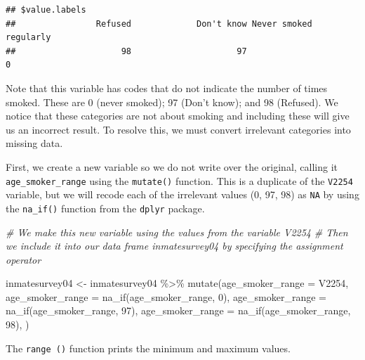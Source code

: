 \documentclass[
]{book}
\newenvironment{Shaded}{\begin{snugshade}}{\end{snugshade}}
\newcommand{\AttributeTok}[1]{\textcolor[rgb]{0.77,0.63,0.00}{#1}}
\newcommand{\CommentTok}[1]{\textcolor[rgb]{0.56,0.35,0.01}{\textit{#1}}}
\newcommand{\ConstantTok}[1]{\textcolor[rgb]{0.00,0.00,0.00}{#1}}
\newcommand{\DecValTok}[1]{\textcolor[rgb]{0.00,0.00,0.81}{#1}}
\newcommand{\FunctionTok}[1]{\textcolor[rgb]{0.00,0.00,0.00}{#1}}
\newcommand{\NormalTok}[1]{#1}
\newcommand{\OtherTok}[1]{\textcolor[rgb]{0.56,0.35,0.01}{#1}}
\newcommand{\SpecialCharTok}[1]{\textcolor[rgb]{0.00,0.00,0.00}{#1}}
\begin{document}
\begin{verbatim}
## $value.labels
##                Refused             Don't know Never smoked regularly 
##                     98                     97                      0
\end{verbatim}

Note that this variable has codes that do not indicate the number of times smoked. These are 0 (never smoked); 97 (Don't know); and 98 (Refused). We notice that these categories are not about smoking and including these will give us an incorrect result. To resolve this, we must convert irrelevant categories into missing data.

First, we create a new variable so we do not write over the original, calling it \texttt{age\_smoker\_range} using the \texttt{mutate()} function. This is a duplicate of the \texttt{V2254} variable, but we will recode each of the irrelevant values (0, 97, 98) as \texttt{NA} by using the \texttt{na\_if()} function from the \texttt{dplyr} package.

\begin{Shaded}
\begin{Highlighting}[]
\CommentTok{\# We make this new variable using the values from the variable \textquotesingle{}V2254\textquotesingle{}}
\CommentTok{\# Then we include it into our data frame \textquotesingle{}inmatesurvey04\textquotesingle{} by specifying the assignment operator}

\NormalTok{inmatesurvey04 }\OtherTok{\textless{}{-}}\NormalTok{ inmatesurvey04 }\SpecialCharTok{\%\textgreater{}\%} 
  \FunctionTok{mutate}\NormalTok{(}\AttributeTok{age\_smoker\_range =}\NormalTok{ V2254,}
           \AttributeTok{age\_smoker\_range =} \FunctionTok{na\_if}\NormalTok{(age\_smoker\_range, }\DecValTok{0}\NormalTok{),}
          \AttributeTok{age\_smoker\_range =} \FunctionTok{na\_if}\NormalTok{(age\_smoker\_range, }\DecValTok{97}\NormalTok{),}
          \AttributeTok{age\_smoker\_range =} \FunctionTok{na\_if}\NormalTok{(age\_smoker\_range, }\DecValTok{98}\NormalTok{),}
\NormalTok{         )}
\end{Highlighting}
\end{Shaded}

The \texttt{range\ ()} function prints the minimum and maximum values.

\begin{Shaded}
\end{Shaded}
\end{document}
